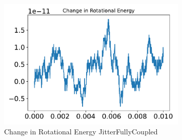 \begin{figure}[htbp]\centerline{\includegraphics[width=0.80\textwidth]{AutoTeX/ChangeInRotationalEnergyJitterFullyCoupled}}\caption{Change in Rotational Energy JitterFullyCoupled}\label{fig:ChangeInRotationalEnergyJitterFullyCoupled}\end{figure}